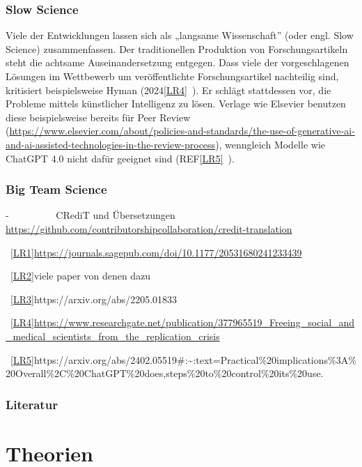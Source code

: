 \documentclass[
  letterpaper,
  DIV=11,
  numbers=noendperiod]{scrreprt}
\begin{document}
\subsection{Slow Science}\label{slow-science}

Viele der Entwicklungen lassen sich als „langsame Wissenschaft'' (oder
engl. Slow Science) zusammenfassen. Der traditionellen Produktion von
Forschungsartikeln steht die achtsame Auseinandersetzung entgegen. Dass
viele der vorgeschlagenen Lösungen im Wettbewerb um veröffentlichte
Forschungsartikel nachteilig sind, kritisiert beispielsweise Hyman
(2024\hyperref[_msocom_4]{{[}LR4{]}}~). Er schlägt stattdessen vor, die
Probleme mittels künstlicher Intelligenz zu lösen. Verlage wie Elsevier
benutzen diese beispielsweise bereits für Peer Review
(\url{https://www.elsevier.com/about/policies-and-standards/the-use-of-generative-ai-and-ai-assisted-technologies-in-the-review-process}),
wenngleich Modelle wie ChatGPT 4.0 nicht dafür geeignet sind
(REF\hyperref[_msocom_5]{{[}LR5{]}}~).

\subsection{Big Team Science}\label{big-team-science}

-~~~~~~~~~ CRediT und Übersetzungen
\url{https://github.com/contributorshipcollaboration/credit-translation}

~\hyperref[_msoanchor_1]{{[}LR1{]}}\url{https://journals.sagepub.com/doi/10.1177/20531680241233439}

~\hyperref[_msoanchor_2]{{[}LR2{]}}viele paper von denen dazu

~\hyperref[_msoanchor_3]{{[}LR3{]}}https://arxiv.org/abs/2205.01833

~\hyperref[_msoanchor_4]{{[}LR4{]}}\url{https://www.researchgate.net/publication/377965519_Freeing_social_and_medical_scientists_from_the_replication_crisis}

~\hyperref[_msoanchor_5]{{[}LR5{]}}https://arxiv.org/abs/2402.05519\#:\textasciitilde:text=Practical\%20implications\%3A\%20Overall\%2C\%20ChatGPT\%20does,steps\%20to\%20control\%20its\%20use.

\subsection{Literatur}\label{literatur-12}

\chapter{Theorien}\label{theorien-1}
\end{document}
